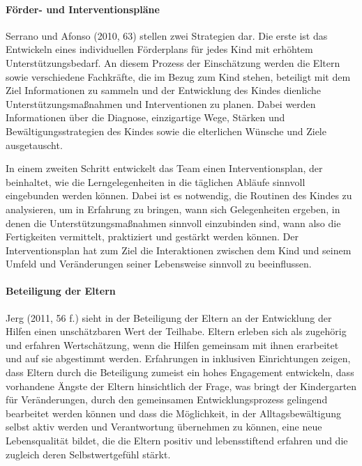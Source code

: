 \paragraph{Förder- und Interventionspläne}\label{Forderplane} 
Serrano und Afonso (2010, 63) stellen zwei Strategien dar. Die erste ist das Entwickeln eines individuellen Förderplans für jedes Kind mit erhöhtem Unterstützungsbedarf. An diesem Prozess der Einschätzung werden die Eltern sowie verschiedene Fachkräfte, die im Bezug zum Kind stehen, beteiligt mit dem Ziel Informationen zu sammeln und der Entwicklung des Kindes dienliche Unterstützungsmaßnahmen und Interventionen zu planen. Dabei werden Informationen über die Diagnose, einzigartige Wege, Stärken und Bewältigungsstrategien des Kindes sowie die elterlichen Wünsche und Ziele ausgetauscht. 

In einem zweiten Schritt entwickelt das Team einen Interventionsplan, der beinhaltet, wie die Lerngelegenheiten in die täglichen Abläufe sinnvoll eingebunden werden können. Dabei ist es notwendig, die Routinen des Kindes zu analysieren, um in Erfahrung zu bringen, wann sich Gelegenheiten ergeben, in denen die Unterstützungsmaßnahmen sinnvoll einzubinden sind, wann also die Fertigkeiten vermittelt, praktiziert und gestärkt werden können. Der Interventionsplan hat zum Ziel die Interaktionen zwischen dem Kind und seinem Umfeld und Veränderungen seiner Lebensweise sinnvoll zu beeinflussen.  

\paragraph{Beteiligung der Eltern} Jerg (2011, 56 f.) sieht in der Beteiligung der Eltern an der Entwicklung der Hilfen einen unschätzbaren Wert der Teilhabe. Eltern erleben sich als zugehörig und erfahren Wertschätzung, wenn die Hilfen gemeinsam mit ihnen erarbeitet und auf sie abgestimmt werden. Erfahrungen in inklusiven Einrichtungen zeigen, dass Eltern durch die Beteiligung zumeist ein hohes Engagement entwickeln, dass vorhandene Ängste der Eltern hinsichtlich der Frage, was bringt der Kindergarten für Veränderungen, durch den gemeinsamen Entwicklungsprozess gelingend bearbeitet werden können und dass die Möglichkeit, in der Alltagsbewältigung selbst aktiv werden und Verantwortung übernehmen zu können, eine neue Lebensqualität bildet, die die Eltern positiv und lebensstiftend erfahren und die zugleich deren Selbstwertgefühl stärkt.     

